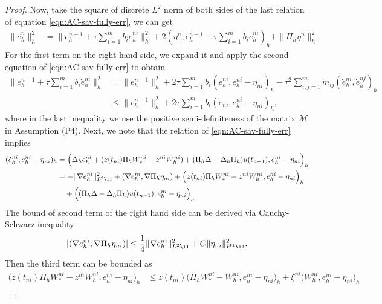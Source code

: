 \begin{proof}
Now, take the square of discrete $L^2$ norm of both sides
of the last relation of equation \eqref{eqn:AC-sav-fully-err},
we can get
\begin{equation}\label{eqn:split-0}
\begin{split}
\|\hat e_h^{n}\|_h^2 & = \|e_h^{n-1}+\tau\sum_{i=1}^{m} b_i\dot{e}_h^{ni}\|_h^2
+ 2(\eta^{n}, e_h^{n-1}+ \tau\sum_{i=1}^{m} b_i\dot{e}_h^{ni})_h + \|\Pi_h \eta^{n}\|_h^2.
\end{split}
\end{equation}
For the first term on the right hand side,
we expand it and apply the second equation of \eqref{eqn:AC-sav-fully-err}  to obtain
\begin{align*}
\|e_h^{n-1}+\tau\sum_{i=1}^{m} b_i\dot{e}_h^{ni}\|_h^2
&= \|e_h^{n-1}\|_h^2 + 2\tau\sum_{i=1}^{m}b_i(\dot{e}_h^{ni},e_h^{ni}-\eta_{ni})_h
- \tau^2\sum_{i,j=1}^{m}m_{ij}(\dot{e}_h^{ni}, \dot{e}_h^{nj})_h\\
&\leq \|e_h^{n-1}\|_h^2 + 2\tau\sum_{i=1}^{m}b_i(\dot{e}_{ni},e_h^{ni}-\eta_{ni})_h,
\end{align*}
where in the last inequality we use the positive semi-definiteness of the matrix $\mathcal{M}$ in Assumption (P4).
Next, we note that the relation of \eqref{eqn:AC-sav-fully-err} implies
\begin{equation*}
\begin{split}
(\dot{e}_h^{ni},e_h^{ni}-\eta_{ni})_h
&= \Big(   \Delta_h e_h^{ni} +  (z(t_{ni}) \Pi_h W_*^{ni} - z^{ni} W_h^{ni})
+ (\Pi_h \Delta - \Delta_h \Pi_h) u(t_{n-1}), e_h^{ni}-\eta_{ni} \Big)_h\\
&= -\|\nabla e_h^{ni}\|_{L^2\II}^2 + (\nabla e_h^{ni} , \nabla \Pi_h \eta_{ni})
+  \Big(z(t_{ni}) \Pi_h W_*^{ni} - z^{ni} W_h^{ni}, e_h^{ni}-\eta_{ni}\Big)_h  \\
& \quad +  \Big(  (\Pi_h \Delta - \Delta_h \Pi_h) u(t_{n-1}), e_h^{ni}-\eta_{ni}\Big)_h
\end{split}
\end{equation*}
The bound of second term of the right hand side can be derived via Cauchy-Schwarz inequality
\begin{equation*}
|(\nabla e_h^{ni} , \nabla \Pi_h \eta_{ni})| \le \frac14 \|  \nabla e_h^{ni} \|_{L^2\II}^2 + C \| \eta_{ni}\|_{H^1\II}^2.
\end{equation*}
Then the third term can be bounded as
\begin{equation*}
\begin{split}
  \Big(z(t_{ni}) \Pi_h W_*^{ni} - z^{ni} W_h^{ni}, e_h^{ni}-\eta_{ni} \Big)_h
 & \le z(t_{ni})  \Big( \Pi_h W_*^{ni} -  W_h^{ni}, e_h^{ni}-\eta_{ni} \Big)_h +  \xi^{ni} \Big( W_h^{ni}, e_h^{ni}-\eta_{ni} \Big)_h\\

\end{split}
\end{equation*}
\end{proof}
